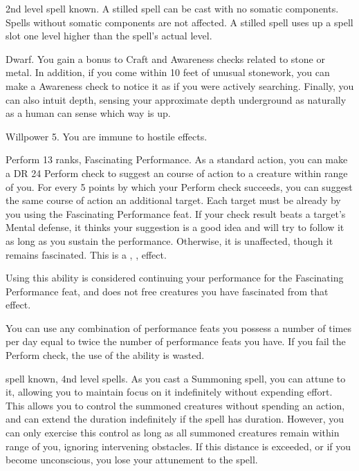 \featpre 2nd level spell known.
\featben A stilled spell can be cast with no somatic components.
Spells without somatic components are not affected.
A stilled spell uses up a spell slot one level higher than the spell's actual level.

\featpre Dwarf.
\featben You gain a  bonus to Craft and Awareness checks related to stone or metal.
In addition, if you come within 10 feet of unusual stonework, you can make a Awareness check to notice it as if you were actively searching.
Finally, you can also intuit depth, sensing your approximate depth underground as naturally as a human can sense which way is up.

\featpre Willpower 5.
\featben You are immune to hostile  effects.

\featpres Perform 13 ranks, Fascinating Performance.
\featben As a standard action, you can make a DR 24 Perform check to suggest an course of action to a creature within \rngmed range of you.
For every 5 points by which your Perform check succeeds, you can suggest the same course of action an additional target.
Each target must be already \fascinated by you using the Fascinating Performance feat.
If your check result beats a target's Mental defense, it thinks your suggestion is a good idea and will try to follow it as long as you sustain the performance.
Otherwise, it is unaffected, though it remains fascinated.
This is a , ,  effect.

Using this ability is considered continuing your performance for the Fascinating Performance feat, and does not free creatures you have fascinated from that effect.

 You can use any combination of performance feats you possess a number of times per day equal to twice the number of performance feats you have.
If you fail the Perform check, the use of the ability is wasted.

\featpres {} spell known, 4nd level spells.
\featben As you cast a Summoning spell, you can attune to it, allowing you to maintain focus on it indefinitely without expending effort.
This allows you to control the summoned creatures without spending an action, and can extend the duration indefinitely if the spell has \durshort duration.
However, you can only exercise this control as long as all summoned creatures remain within \rnglong range of you, ignoring intervening obstacles.
If this distance is exceeded, or if you become unconscious, you lose your attunement to the spell.

